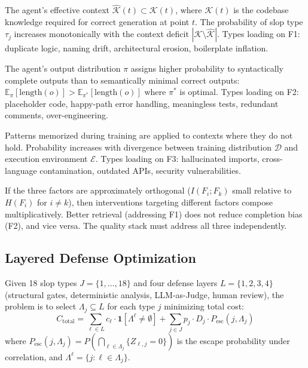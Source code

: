 \begin{definition}
The agent's effective context $\hat{\mathcal{K}}(t) \subset \mathcal{K}(t)$, where $\mathcal{K}(t)$ is the codebase knowledge required for correct generation at point $t$. The probability of slop type $\tau_j$ increases monotonically with the context deficit $|\mathcal{K} \setminus \hat{\mathcal{K}}|$. Types loading on F1: duplicate logic, naming drift, architectural erosion, boilerplate inflation.
\end{definition}

\begin{definition}
The agent's output distribution $\pi$ assigns higher probability to syntactically complete outputs than to semantically minimal correct outputs: $\mathbb{E}_\pi[\mathrm{length}(o)] > \mathbb{E}_{\pi^*}[\mathrm{length}(o)]$ where $\pi^*$ is optimal. Types loading on F2: placeholder code, happy-path error handling, meaningless tests, redundant comments, over-engineering.
\end{definition}

\begin{definition}
Patterns memorized during training are applied to contexts where they do not hold. Probability increases with divergence between training distribution $\mathcal{D}$ and execution environment $\mathcal{E}$. Types loading on F3: hallucinated imports, cross-language contamination, outdated APIs, security vulnerabilities.
\end{definition}

If the three factors are approximately orthogonal ($I(F_i; F_k)$ small relative to $H(F_i)$ for $i \neq k$), then interventions targeting different factors compose multiplicatively. Better retrieval (addressing F1) does not reduce completion bias (F2), and vice versa. The quality stack must address all three independently.

\subsection{Layered Defense Optimization}

Given 18 slop types $J = \{1, \ldots, 18\}$ and four defense layers $L = \{1, 2, 3, 4\}$ (structural gates, deterministic analysis, LLM-as-Judge, human review), the problem is to select $\Lambda_j \subseteq L$ for each type $j$ minimizing total cost:
\begin{equation}
C_{\mathrm{total}} = \sum_{\ell \in L} c_\ell \cdot \mathbf{1}[\Lambda^\ell \neq \emptyset] + \sum_{j \in J} p_j \cdot D_j \cdot P_{\mathrm{esc}}(j, \Lambda_j)
\end{equation}
where $P_{\mathrm{esc}}(j, \Lambda_j) = P(\bigcap_{\ell \in \Lambda_j} \{Z_{\ell,j} = 0\})$ is the escape probability under correlation, and $\Lambda^\ell = \{j : \ell \in \Lambda_j\}$.

